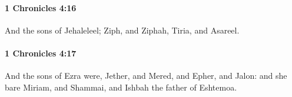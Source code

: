 		\paragraph{1 Chronicles 4:16} %
			\label{1CHRONICLES-4-16}

			And the sons of Jehaleleel; Ziph, and Ziphah, Tiria, and Asareel.


		\paragraph{1 Chronicles 4:17} %
			\label{1CHRONICLES-4-17}

			And the sons of Ezra were, Jether, and Mered, and Epher, and Jalon: and she bare Miriam, and Shammai, and Ishbah the father of Eshtemoa.


